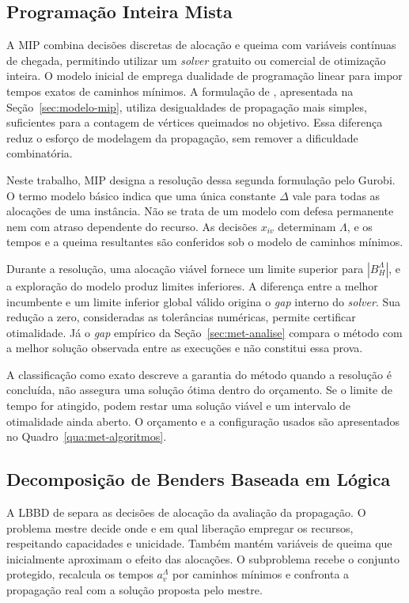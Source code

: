 \subsection{Programação Inteira Mista}\label{sec:metodo-mip}

A MIP combina decisões discretas de alocação e queima com variáveis
contínuas de chegada, permitindo utilizar um \textit{solver} gratuito ou
comercial de otimização inteira. O modelo inicial de
 emprega dualidade de programação linear para
impor tempos exatos de caminhos mínimos. A formulação de
, apresentada na Seção~\ref{sec:modelo-mip},
utiliza desigualdades de propagação mais simples, suficientes para a
contagem de vértices queimados no objetivo. Essa diferença reduz o esforço
de modelagem da propagação, sem remover a dificuldade combinatória.

Neste trabalho, MIP designa a resolução dessa segunda formulação pelo
Gurobi. O termo modelo básico indica que uma única constante $\Delta$
vale para todas as alocações de uma instância. Não se trata de um modelo
com defesa permanente nem com atraso dependente do recurso.
As decisões $x_{iv}$ determinam $\Lambda$, e os tempos e a queima resultantes
são conferidos sob o modelo de caminhos mínimos.

Durante a resolução, uma alocação viável fornece um limite superior para
$|B_H^{\Lambda}|$, e a exploração do modelo produz limites inferiores.
A diferença entre a melhor incumbente e um limite inferior global válido
origina o \textit{gap} interno do \textit{solver}. Sua redução a zero,
consideradas as tolerâncias numéricas, permite certificar otimalidade.
Já o \textit{gap} empírico da Seção~\ref{sec:met-analise} compara o método
com a melhor solução observada entre as execuções e não constitui essa prova.

A classificação como exato descreve a garantia do método quando a
resolução é concluída, não assegura uma solução ótima dentro do orçamento.
Se o limite de tempo for atingido, podem restar uma solução viável e um
intervalo de otimalidade ainda aberto. O orçamento e a configuração usados
são apresentados no Quadro~\ref{qua:met-algoritmos}.

\subsection{Decomposição de Benders Baseada em Lógica}\label{sec:lbbd}

A LBBD de  separa as decisões de alocação
da avaliação da propagação. O problema mestre decide onde e em qual
liberação empregar os recursos, respeitando capacidades e unicidade.
Também mantém variáveis de queima que inicialmente aproximam o efeito
das alocações. O subproblema recebe o conjunto protegido, recalcula os
tempos $a_v^{\Lambda}$ por caminhos mínimos e confronta a propagação real
com a solução proposta pelo mestre.

